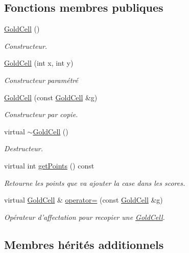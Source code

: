 \subsection*{Fonctions membres publiques}
\begin{DoxyCompactItemize}
\item 
\hyperlink{class_gold_cell_ae7b344911cc3027935f0f9142e05d184}{Gold\-Cell} ()
\begin{DoxyCompactList}\small\item\em Constructeur. \end{DoxyCompactList}\item 
\hyperlink{class_gold_cell_a3bff4553728b09dd6aa1a1a27961eea7}{Gold\-Cell} (int x, int y)
\begin{DoxyCompactList}\small\item\em Constructeur paramétré \end{DoxyCompactList}\item 
\hyperlink{class_gold_cell_abac5d2fdba9d335d4e59866228381b6b}{Gold\-Cell} (const \hyperlink{class_gold_cell}{Gold\-Cell} \&g)
\begin{DoxyCompactList}\small\item\em Constructeur par copie. \end{DoxyCompactList}\item 
virtual \hyperlink{class_gold_cell_a385e8c1656defcd6063c955db8869d87}{$\sim$\-Gold\-Cell} ()
\begin{DoxyCompactList}\small\item\em Destructeur. \end{DoxyCompactList}\item 
virtual int \hyperlink{class_gold_cell_a1f111db9bdb520176a48bb689c7baf2b}{get\-Points} () const 
\begin{DoxyCompactList}\small\item\em Retourne les points que va ajouter la case dans les scores. \end{DoxyCompactList}\item 
virtual \hyperlink{class_gold_cell}{Gold\-Cell} \& \hyperlink{class_gold_cell_ac858c489397f874d2091d2987a321cfa}{operator=} (const \hyperlink{class_gold_cell}{Gold\-Cell} \&g)
\begin{DoxyCompactList}\small\item\em Opérateur d'affectation pour recopier une \hyperlink{class_gold_cell}{Gold\-Cell}. \end{DoxyCompactList}\end{DoxyCompactItemize}
\subsection*{Membres hérités additionnels}


